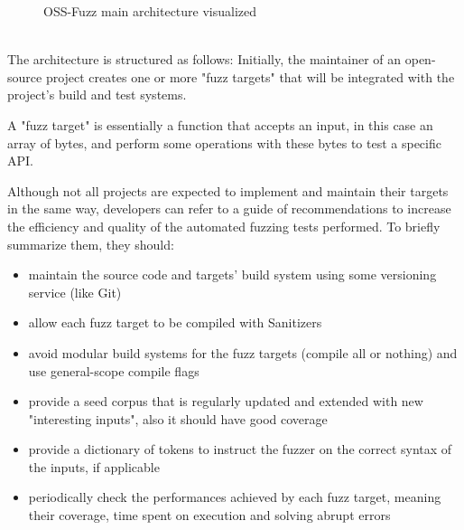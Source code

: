 \begin{figure}[h]
\caption{OSS-Fuzz main architecture visualized \cite{ossfuzz_docs}}
\label{fig:ossfuzz_architecture}
\end{figure}
\ \\
The architecture is structured as follows:
Initially, the maintainer of an open-source project creates one or more "fuzz targets" that will be integrated with the project's build and test systems. \cite{libfuzzer_docs}

A "fuzz target" is essentially a function that accepts an input, in this case an array of bytes, and perform some operations with these bytes to test a specific API.

Although not all projects are expected to implement and maintain their targets in the same way, developers can refer to a guide of recommendations to increase the efficiency and quality of the automated fuzzing tests performed.
To briefly summarize them, they should:
\begin{itemize}
    \item maintain the source code and targets' build system using some versioning service (like Git)
    \item allow each fuzz target to be compiled with Sanitizers
    \item avoid modular build systems for the fuzz targets (compile all or nothing) and use general-scope compile flags
    \item provide a seed corpus that is regularly updated and extended with new "interesting inputs", also it should have good coverage
    \item provide a dictionary of tokens to instruct the fuzzer on the correct syntax of the inputs, if applicable
    \item periodically check the performances achieved by each fuzz target, meaning their coverage, time spent on execution and solving abrupt errors
\end{itemize}

